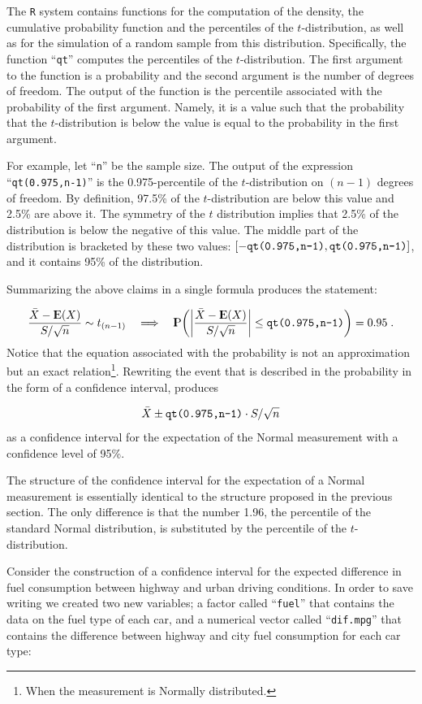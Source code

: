 \documentclass[]{krantz}
\newcommand{\Expec}{{\rm I\kern-.3em E}}
\newcommand{\Prob}{{\rm I\kern-.3em P}}
\theoremstyle{definition}
\theoremstyle{definition}
\theoremstyle{definition}
\theoremstyle{remark}
\begin{document}
The \texttt{R} system contains functions for the computation of the density,
the cumulative probability function and the percentiles of the
\(t\)-distribution, as well as for the simulation of a random sample from
this distribution. Specifically, the function ``\texttt{qt}'' computes the
percentiles of the \(t\)-distribution. The first argument to the function
is a probability and the second argument is the number of degrees of
freedom. The output of the function is the percentile associated with
the probability of the first argument. Namely, it is a value such that
the probability that the \(t\)-distribution is below the value is equal to
the probability in the first argument.

For example, let ``\texttt{n}'' be the sample size. The output of the expression
``\texttt{qt(0.975,n-1)}'' is the 0.975-percentile of the \(t\)-distribution on
\((n-1)\) degrees of freedom. By definition, 97.5\% of the \(t\)-distribution
are below this value and 2.5\% are above it. The symmetry of the \(t\)
distribution implies that 2.5\% of the distribution is below the negative
of this value. The middle part of the distribution is bracketed by these
two values:
\([-\mbox{\texttt{qt(0.975,n-1)}}, \mbox{\texttt{qt(0.975,n-1)}}]\), and
it contains 95\% of the distribution.

Summarizing the above claims in a single formula produces the statement:

\[\frac{\bar X - \Expec(X)}{S/\sqrt{n}} \sim t_{(n-1)} \quad \Longrightarrow \quad \Prob \bigg(\bigg|\frac{\bar X - \Expec(X)}{S/\sqrt{n}}\bigg| \leq \mbox{\texttt{qt(0.975,n-1)}} \bigg) = 0.95\;.\]
Notice that the equation associated with the probability is not an
approximation but an exact relation\footnote{When the measurement is Normally distributed.}. Rewriting the event that is
described in the probability in the form of a confidence interval,
produces

\[\bar X \pm \mbox{\texttt{qt(0.975,n-1)}}\cdot S/ \sqrt{n}\]
as a confidence interval for the expectation of the Normal measurement
with a confidence level of 95\%.

The structure of the confidence interval for the expectation of a Normal
measurement is essentially identical to the structure proposed in the
previous section. The only difference is that the number 1.96, the
percentile of the standard Normal distribution, is substituted by the
percentile of the \(t\)-distribution.

Consider the construction of a confidence interval for the expected
difference in fuel consumption between highway and urban driving
conditions. In order to save writing we created two new variables; a
factor called ``\texttt{fuel}'' that contains the data on the fuel type of each
car, and a numerical vector called ``\texttt{dif.mpg}'' that contains the
difference between highway and city fuel consumption for each car type:
\end{document}

